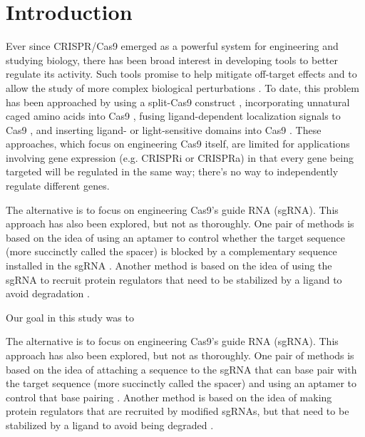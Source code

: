 \documentclass[10pt,oneside]{article}
\begin{document}
\section{Introduction}


Ever since CRISPR/Cas9 emerged as a powerful system for engineering and studying biology, there has been broad interest in developing tools to better regulate its activity.  Such tools promise to help mitigate off-target effects and to allow the study of more complex biological perturbations \autocite{richter2017}.  To date, this problem has been approached by using a split-Cas9 construct \autocite{zetsche2015,nguyen2016,nihongaki2015}, incorporating unnatural caged amino acids into Cas9 \autocite{hemphill2015,luo2016}, fusing ligand-dependent localization signals to Cas9 \autocite{liuramli2016}, and inserting ligand- or light-sensitive domains into Cas9 \autocite{oakes2016,richter2016}.  These approaches, which focus on engineering Cas9 itself, are limited for applications involving gene expression (e.g. CRISPRi or CRISPRa) in that every gene being targeted will be regulated in the same way; there's no way to independently regulate different genes.




The alternative is to focus on engineering Cas9's guide RNA (sgRNA).  This approach has also been explored, but not as thoroughly.  One pair of methods is based on the idea of using an aptamer to control whether the  target sequence (more succinctly called the spacer) is blocked by a complementary sequence installed in the sgRNA \autocite{liu2016,tang2017}.  Another method is based on the idea of using the sgRNA to recruit protein regulators that need to be stabilized by a ligand to avoid degradation \autocite{maji2017}.  

Our goal in this study was to 

The alternative is to focus on engineering Cas9's guide RNA (sgRNA).  This approach has also been explored, but not as thoroughly.  One pair of methods is based on the idea of attaching a sequence to the sgRNA that can base pair with the  target sequence (more succinctly called the spacer) and using an aptamer to control that base pairing \autocite{liu2016,tang2017}.  Another method is based on the idea of making protein regulators that are recruited by modified sgRNAs, but that need to be stabilized by a ligand to avoid being degraded \autocite{maji2017}.  
\end{document}
